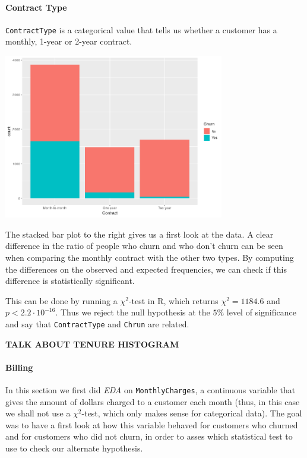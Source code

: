 \documentclass[man, floatsintext]{apa6}
\begin{document}
\paragraph{Contract Type}
\texttt{ContractType} is a categorical value that tells us whether a customer has a monthly, 1-year or 2-year contract.

\hspace{0.5mm}

\noindent\begin{minipage}{0.54\textwidth}
\includegraphics[width = \linewidth, height = 72mm]{CountvsContractTypebyChurn}
\end{minipage}
\hfill
\begin{minipage}{0.42\textwidth} The stacked bar plot to the right gives us a first look at the data. A clear difference in the ratio of people who churn and who don't churn can be seen when comparing the monthly contract with the other two types. By computing the differences on the observed and expected frequencies, we can check if this difference is statistically significant.
\end{minipage}

\hspace{0.5mm}

This can be done by running a $\chi^2$-test in R, which returns $\chi^2 = 1184.6$ and $p < 2.2 \cdot 10^{-16}$. Thus we reject the null hypothesis at the $5 \%$ level of significance and say that \texttt{ContractType} and \texttt{Chrun} are related.

\textbf{TALK ABOUT TENURE HISTOGRAM}

\paragraph{Billing}

In this section we first did \textit{EDA} on \texttt{MonthlyCharges}, a continuous variable that gives the amount of dollars charged to a customer each month (thus, in this case we shall not use a $\chi^2$-test, which only makes sense for categorical data). The goal was to have a first look at how this variable behaved for customers who churned and for customers who did not churn, in order to asses which statistical test to use to check our alternate hypothesis.
\end{document}
